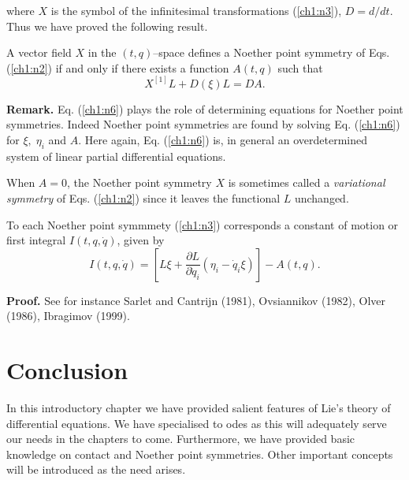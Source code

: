 where $X$ is the symbol of the infinitesimal transformations (\ref{ch1:n3}),
$D=d/dt$. Thus we have proved the following result.
\begin{theo}
\begin{em}
A vector field $X$ in the $(t,q)$--space defines a Noether point symmetry of
Eqs. (\ref{ch1:n2}) if and only if there exists a function $A(t,q)$ such that
\begin{equation}
\label{ch1:n6}
X^{[1]}L+D(\xi)L=DA.
\end{equation}
\end{em}
\end{theo}
{\bf Remark.} Eq. (\ref{ch1:n6}) plays the role of determining equations for
Noether point symmetries. Indeed Noether point symmetries are found by solving
Eq. (\ref{ch1:n6}) for $\xi,\;\eta_i$ and $A$. Here again, Eq. (\ref{ch1:n6}) is,
in general an  overdetermined system of linear partial differential equations.

When $A=0$, the Noether point symmetry $X$ is sometimes called
a {\em variational symmetry} of Eqs. (\ref{ch1:n2}) since it leaves the
functional $L$ unchanged.

\begin{theo}[Noether 1918]
\begin{em}
To each Noether point symmmety (\ref{ch1:n3}) corresponds a constant of motion or
first integral
$I(t,q,\dot q)$, given by
\begin{equation}
\label{ch1:n7}
I(t,q,\dot q)=\left [ L\xi+\frac{\partial L}{\partial \dot q_i}
(\eta_i-\dot q_i \xi) \right ]-A(t,q).
\end{equation}
\end{em}
\end{theo}
{\bf Proof.} See for instance Sarlet and Cantrijn (1981), Ovsiannikov (1982),
Olver (1986), Ibragimov (1999).
\section{Conclusion}
In this introductory chapter we have provided salient features of Lie's
theory of differential equations. We have specialised to odes as
this will adequately serve our needs in the chapters to come.
Furthermore, we have provided basic knowledge
on contact  and Noether point symmetries. Other important concepts will be
introduced as the need arises.


